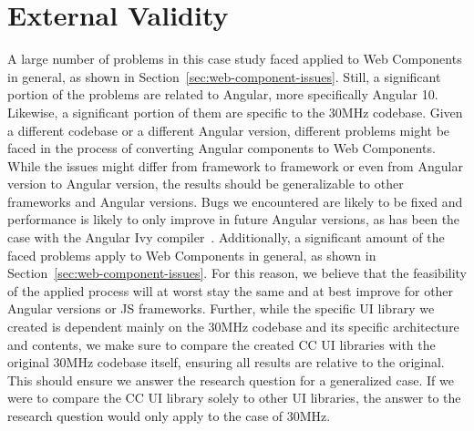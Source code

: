 \section{External Validity}
A large number of problems in this case study faced applied to Web Components in general, as shown in Section~\ref{sec:web-component-issues}. Still, a significant portion of the problems are related to Angular, more specifically Angular 10. Likewise, a significant portion of them are specific to the 30MHz codebase. Given a different codebase or a different Angular version, different problems might be faced in the process of converting Angular components to Web Components. While the issues might differ from framework to framework or even from Angular version to Angular version, the results should be generalizable to other frameworks and Angular versions. Bugs we encountered are likely to be fixed and performance is likely to only improve in future Angular versions, as has been the case with the Angular Ivy compiler~. Additionally, a significant amount of the faced problems apply to Web Components in general, as shown in Section~\ref{sec:web-component-issues}. For this reason, we believe that the feasibility of the applied process will at worst stay the same and at best improve for other Angular versions or JS frameworks.
Further, while the specific UI library we created is dependent mainly on the 30MHz codebase and its specific architecture and contents, we make sure to compare the created CC UI libraries with the original 30MHz codebase itself, ensuring all results are relative to the original. This should ensure we answer the research question for a generalized case. If we were to compare the CC UI library solely to other UI libraries, the answer to the research question would only apply to the case of 30MHz.